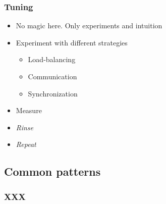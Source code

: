 \begin{frame}
  \frametitle{Tuning}
  \begin{itemize}
  \item No magic here. Only experiments and intuition
  \item Experiment with different strategies
    \begin{itemize}
    \item Load-balancing
    \item Communication
    \item Synchronization
    \end{itemize}
  \item Measure
  \item \emph{Rinse}
  \item \emph{Repeat}
  \end{itemize}
\end{frame}


\subsection{Common patterns}
\label{subsec:parpatterns}

\begin{frame}
  \frametitle{XXX}

\end{frame}
